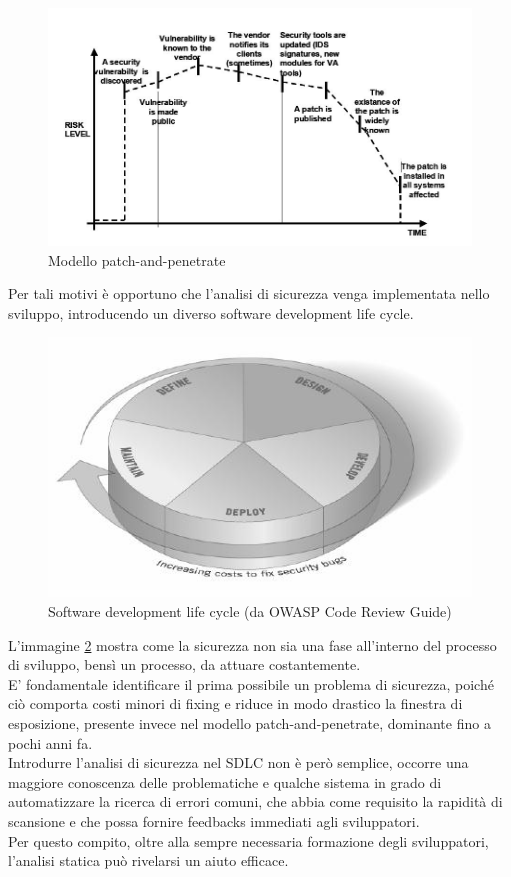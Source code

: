 \begin{figure}[!h]
\centering
\includegraphics[width=15cm]{patchpenetrate.jpg}
\caption{Modello patch-and-penetrate}\label{pep}
\end{figure}


Per tali motivi è opportuno che l'analisi di sicurezza venga implementata nello sviluppo, introducendo un diverso software development life cycle.

\begin{figure}[!h]
\centering
\includegraphics[width=15cm]{sdlc.jpg}
\caption{Software development life cycle (da OWASP Code Review Guide)}\label{sdlc}
\end{figure}

L'immagine \ref{sdlc} mostra come la sicurezza non sia una fase all'interno del processo di sviluppo, bensì un processo, da attuare costantemente.\\
E' fondamentale identificare il prima possibile un problema di sicurezza, poiché ciò comporta costi minori di fixing e riduce in modo drastico la finestra di esposizione, presente invece nel modello patch-and-penetrate, dominante fino a pochi anni fa. \\
Introdurre l'analisi di sicurezza nel SDLC non è però semplice, occorre una maggiore conoscenza delle problematiche e qualche sistema in grado di automatizzare la ricerca di errori comuni, che abbia come requisito la rapidità di scansione e che possa fornire feedbacks immediati agli sviluppatori.\\
Per questo compito, oltre alla sempre necessaria formazione degli sviluppatori, l'analisi statica può rivelarsi un aiuto efficace.


